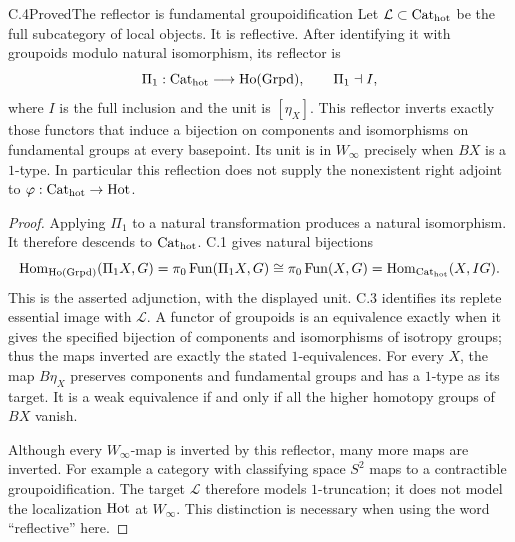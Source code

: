 \begin{claim}{C.4}{Proved}{The reflector is fundamental groupoidification}
Let $\mathcal L\subset{\mathrm{Cat}_{\mathrm{hot}}}$ be the full subcategory of local
objects.  It is reflective.  After identifying it with groupoids modulo
natural isomorphism, its reflector is
\[
 \Pi_1:{\mathrm{Cat}_{\mathrm{hot}}}\longrightarrow\operatorname{Ho}(\mathrm{Grpd}),
 \qquad \Pi_1\dashv I,
\]
where $I$ is the full inclusion and the unit is $[\eta_X]$.
This reflector inverts exactly those functors that induce a bijection
on components and isomorphisms on fundamental groups at every
basepoint.  Its unit is in $W_\infty$ precisely when $BX$ is a
$1$-type.  In particular this reflection does not supply the nonexistent
right adjoint to $\varphi:{\mathrm{Cat}_{\mathrm{hot}}}\to\mathrm{Hot}$.
\end{claim}
\begin{proof}
Applying $\Pi_1$ to a natural transformation produces a natural
isomorphism.  It therefore descends to ${\mathrm{Cat}_{\mathrm{hot}}}$.  C.1 gives natural
bijections
\[
 \operatorname{Hom}_{\operatorname{Ho}(\mathrm{Grpd})}(\Pi_1X,G)
   =\pi_0\operatorname{Fun}(\Pi_1X,G)
   \cong\pi_0\operatorname{Fun}(X,G)
   =\operatorname{Hom}_{{\mathrm{Cat}_{\mathrm{hot}}}}(X,IG).
\]
This is the asserted adjunction, with the displayed unit.  C.3
identifies its replete essential image with $\mathcal L$.
A functor of groupoids is an equivalence exactly when it gives the
specified bijection of components and isomorphisms of isotropy groups;
thus the maps inverted are exactly the stated $1$-equivalences.
For every $X$, the map $B\eta_X$ preserves components and fundamental
groups and has a $1$-type as its target.  It is a weak equivalence if
and only if all the higher homotopy groups of $BX$ vanish.

Although every $W_\infty$-map is inverted by this reflector, many more
maps are inverted.  For example a category with classifying space $S^2$
maps to a contractible groupoidification.  The target $\mathcal L$
therefore models $1$-truncation; it does not model the localization
$\mathrm{Hot}$ at $W_\infty$.  This distinction is necessary when using the
word ``reflective'' here.
\end{proof}

